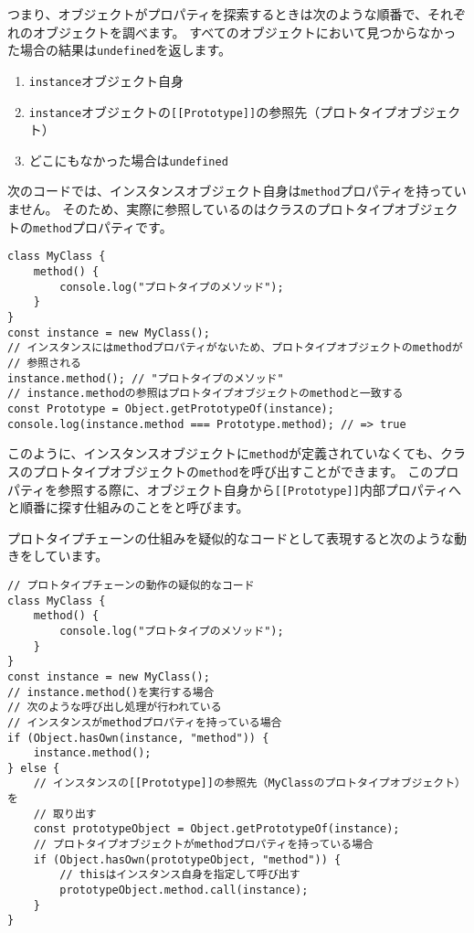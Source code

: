 つまり、オブジェクトがプロパティを探索するときは次のような順番で、それぞれのオブジェクトを調べます。
すべてのオブジェクトにおいて見つからなかった場合の結果は\texttt{undefined}を返します。

\begin{enumerate}
\def\labelenumi{\arabic{enumi}.}
\item
  \texttt{instance}オブジェクト自身
\item
  \texttt{instance}オブジェクトの\texttt{[[Prototype]]}の参照先（プロトタイプオブジェクト）
\item
  どこにもなかった場合は\texttt{undefined}
\end{enumerate}

次のコードでは、インスタンスオブジェクト自身は\texttt{method}プロパティを持っていません。
そのため、実際に参照しているのはクラスのプロトタイプオブジェクトの\texttt{method}プロパティです。

\begin{lstlisting}
class MyClass {
    method() {
        console.log("プロトタイプのメソッド");
    }
}
const instance = new MyClass();
// インスタンスにはmethodプロパティがないため、プロトタイプオブジェクトのmethodが
// 参照される
instance.method(); // "プロトタイプのメソッド"
// instance.methodの参照はプロトタイプオブジェクトのmethodと一致する
const Prototype = Object.getPrototypeOf(instance);
console.log(instance.method === Prototype.method); // => true
\end{lstlisting}

このように、インスタンスオブジェクトに\texttt{method}が定義されていなくても、クラスのプロトタイプオブジェクトの\texttt{method}を呼び出すことができます。
このプロパティを参照する際に、オブジェクト自身から\texttt{[[Prototype]]}内部プロパティへと順番に探す仕組みのことを\textbf{}と呼びます。

プロトタイプチェーンの仕組みを疑似的なコードとして表現すると次のような動きをしています。

\begin{lstlisting}
// プロトタイプチェーンの動作の疑似的なコード
class MyClass {
    method() {
        console.log("プロトタイプのメソッド");
    }
}
const instance = new MyClass();
// instance.method()を実行する場合
// 次のような呼び出し処理が行われている
// インスタンスがmethodプロパティを持っている場合
if (Object.hasOwn(instance, "method")) {
    instance.method();
} else {
    // インスタンスの[[Prototype]]の参照先（MyClassのプロトタイプオブジェクト）を
    // 取り出す
    const prototypeObject = Object.getPrototypeOf(instance);
    // プロトタイプオブジェクトがmethodプロパティを持っている場合
    if (Object.hasOwn(prototypeObject, "method")) {
        // thisはインスタンス自身を指定して呼び出す
        prototypeObject.method.call(instance);
    }
}
\end{lstlisting}

